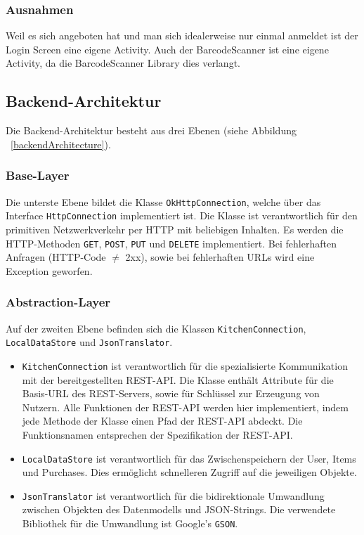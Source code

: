 \subsubsection{Ausnahmen}
Weil es sich angeboten hat und man sich idealerweise nur einmal anmeldet ist der Login Screen eine eigene Activity. 
Auch der BarcodeScanner ist eine eigene Activity, da die BarcodeScanner Library dies verlangt.


\subsection{Backend-Architektur}\label{subsec:backend}

Die Backend-Architektur besteht aus drei Ebenen (siehe Abbildung ~\ref{backendArchitecture}).

\subsubsection{Base-Layer}

Die unterste Ebene bildet die Klasse \texttt{OkHttpConnection}, welche über das Interface \texttt{HttpConnection} implementiert ist.
Die Klasse ist verantwortlich für den primitiven Netzwerkverkehr per HTTP mit beliebigen Inhalten.
Es werden die HTTP-Methoden \texttt{GET}, \texttt{POST}, \texttt{PUT} und \texttt{DELETE} implementiert.
Bei fehlerhaften Anfragen (HTTP-Code $\neq$ 2xx), sowie bei fehlerhaften URLs wird eine Exception geworfen.

\subsubsection{Abstraction-Layer}

Auf der zweiten Ebene befinden sich die Klassen \texttt{KitchenConnection}, \texttt{LocalDataStore} und \texttt{JsonTranslator}.

\begin{itemize}
	\item  \texttt{KitchenConnection} ist verantwortlich für die spezialisierte Kommunikation mit der bereitgestellten REST-API. Die Klasse enthält Attribute für die Basis-URL des REST-Servers, sowie für Schlüssel zur Erzeugung von Nutzern.
	Alle Funktionen der REST-API werden hier implementiert, indem jede Methode der Klasse einen Pfad der REST-API abdeckt.
	Die Funktionsnamen entsprechen der Spezifikation der REST-API\@.

	\item \texttt{LocalDataStore} ist verantwortlich für das Zwischenspeichern der User, Items und Purchases.
	Dies ermöglicht schnelleren Zugriff auf die jeweiligen Objekte.

	\item \texttt{JsonTranslator} ist verantwortlich für die bidirektionale Umwandlung zwischen Objekten des Datenmodells und JSON-Strings.
	Die verwendete Bibliothek für die Umwandlung ist Google's \texttt{GSON}.
\end{itemize}

